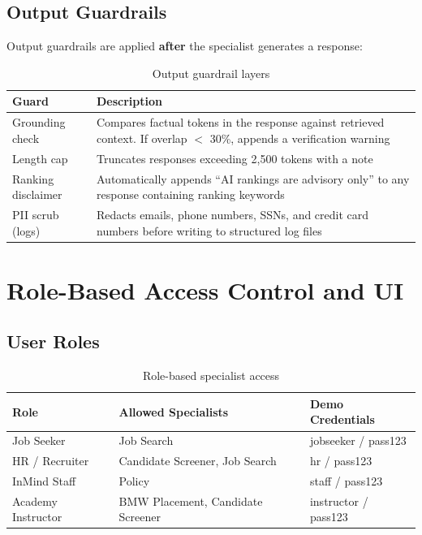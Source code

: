 \documentclass[12pt, a4paper]{article}
\begin{document}
\subsection{Output Guardrails}

Output guardrails are applied \textbf{after} the specialist generates a response:

\begin{table}[H]
\centering
\caption{Output guardrail layers}
\begin{tabularx}{\textwidth}{l X}
\toprule
\textbf{Guard} & \textbf{Description} \\
\midrule
Grounding check & Compares factual tokens in the response against retrieved context. If overlap $<$ 30\%, appends a verification warning \\
Length cap & Truncates responses exceeding 2{,}500 tokens with a note \\
Ranking disclaimer & Automatically appends ``AI rankings are advisory only'' to any response containing ranking keywords \\
PII scrub (logs) & Redacts emails, phone numbers, SSNs, and credit card numbers before writing to structured log files \\
\bottomrule
\end{tabularx}
\label{tab:output_guards}
\end{table}

\section{Role-Based Access Control and UI}

\subsection{User Roles}

\begin{table}[H]
\centering
\caption{Role-based specialist access}
\begin{tabular}{l l l}
\toprule
\textbf{Role} & \textbf{Allowed Specialists} & \textbf{Demo Credentials} \\
\midrule
Job Seeker & Job Search & jobseeker / pass123 \\
HR / Recruiter & Candidate Screener, Job Search & hr / pass123 \\
InMind Staff & Policy & staff / pass123 \\
Academy Instructor & BMW Placement, Candidate Screener & instructor / pass123 \\
\bottomrule
\end{tabular}
\label{tab:roles}
\end{table}
\end{document}
